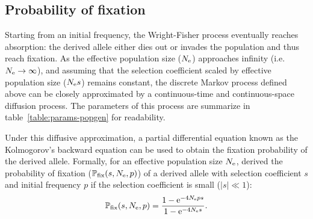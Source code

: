 \subsection{Probability of fixation}

Starting from an initial frequency, the Wright-Fisher process eventually reaches absorption: the derived allele either dies out or invades the population and thus reach fixation.
As the effective population size ($N_{\text{e}}$) approaches infinity (i.e. $ N_{\text{e}} \to \infty$), and assuming that the selection coefficient scaled by effective population size ($N_{\text{e}} s $) remains constant, the discrete Markov process defined above can be closely approximated by a continuous-time and continuous-space diffusion process.
The parameters of this process are summarize in table~\ref{table:params-popgen} for readability.

\begin{table}[H]
	\centering
	\noindent{}
	\caption[Parameters of population genetics]{Parameters of population genetics}\label{table:params-popgen}
\end{table}

Under this diffusive approximation, a partial differential equation known as the Kolmogorov's backward equation can be used to obtain the fixation probability of the derived allele.
Formally, for an effective population size $N_{\text{e}}$, \citet{Kimura1962} derived the probability of fixation ($\mathbb{P}_{\text{fix}}(s, N_{\text{e}}, p)$) of a derived allele with selection coefficient $s$ and initial frequency $p$ if the selection coefficient is small ($|s| \ll 1$):
\begin{equation}
    \mathbb{P}_{\text{fix}}(s, N_{\text{e}}, p) = \dfrac{1 - \text{e}^{-4 N_{\text{e}} p s }}{1 - \text{e}^{-4 N_{\text{e}} s}}.
\end{equation}

